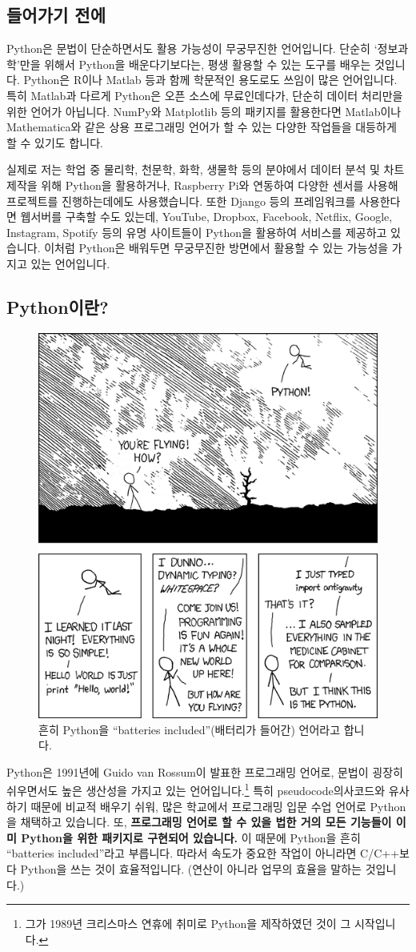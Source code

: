 \documentclass[../main.tex]{subfiles}
\begin{document}
\subsection{들어가기 전에}
Python은 문법이 단순하면서도 활용 가능성이 무궁무진한 언어입니다.
단순히 `정보과학'만을 위해서 Python을 배운다기보다는, 평생 활용할 수 있는 도구를 배우는 것입니다.
Python은 R이나 Matlab 등과 함께 학문적인 용도로도 쓰임이 많은 언어입니다.
특히 Matlab과 다르게 Python은 오픈 소스에 무료인데다가, 단순히 데이터 처리만을 위한 언어가 아닙니다.
NumPy와 Matplotlib 등의 패키지를 활용한다면 Matlab이나 Mathematica와 같은 상용 프로그래밍 언어가 할 수 있는 다양한 작업들을 대등하게 할 수 있기도 합니다.

실제로 저는 학업 중 물리학, 천문학, 화학, 생물학 등의 분야에서 데이터 분석 및 차트 제작을 위해 Python을 활용하거나, Raspberry Pi와 연동하여 다양한 센서를 사용해 프로젝트를 진행하는데에도 사용했습니다.
또한 Django 등의 프레임워크를 사용한다면 웹서버를 구축할 수도 있는데, YouTube, Dropbox, Facebook, Netflix, Google, Instagram, Spotify 등의 유명 사이트들이 Python을 활용하여 서비스를 제공하고 있습니다.
이처럼 Python은 배워두면 무궁무진한 방면에서 활용할 수 있는 가능성을 가지고 있는 언어입니다.

\subsection{Python이란?}
\begin{figure}[htbp]
  \centering
  \includegraphics[width=0.6\linewidth]{./figures/xkcd_python}
  \caption*{흔히 Python을 ``batteries included''(배터리가 들어간) 언어라고 합니다.}\label{fig:meme}
\end{figure}
Python은 1991년에 Guido van Rossum이 발표한 프로그래밍 언어로, 문법이 굉장히 쉬우면서도 높은 생산성을 가지고 있는 언어입니다.\footnote{그가 1989년 크리스마스 연휴에 취미로 Python을 제작하였던 것이 그 시작입니다.}
특히 pseudocode의사코드와 유사하기 때문에 비교적 배우기 쉬워, 많은 학교에서 프로그래밍 입문 수업 언어로 Python을 채택하고 있습니다.
또, \textbf{프로그래밍 언어로 할 수 있을 법한 거의 모든 기능들이 이미 Python을 위한 패키지로 구현되어 있습니다.}
이 때문에 Python을 흔히 ``batteries included''라고 부릅니다.
따라서 속도가 중요한 작업이 아니라면 C/C++보다 Python을 쓰는 것이 효율적입니다.
(연산이 아니라 업무의 효율을 말하는 것입니다.)
\end{document}
